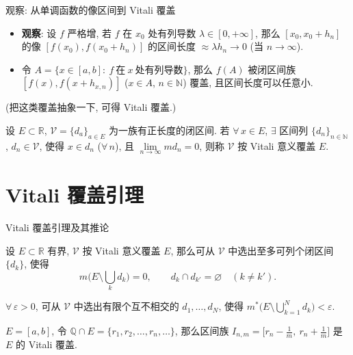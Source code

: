 \begin{frame}{观察: 从单调函数的像区间到 Vitali 覆盖}

\begin{itemize}
\item \textbf{观察}: 设 $f$ 严格增, 若 $f$ 在 $x_0$ 处有列导数 $\lambda \in [0, +\infty]$,
  那么 $[x_0, x_0 + h_n]$ 的像 $[f(x_0), f(x_0 + h_n)]$ 的区间长度
  $\approx \lambda h_n \to 0$ (当 $n \to \infty$).
\item 令 $A = \{ x \in [a, b]:\ f\ \text{在}\ x\ \text{处有列导数} \}$, 那么 $f(A)$
  被闭区间族 $[f(x), f(x + h_{x, n})]$ ($x \in A$, $n \in \mathbb{N}$) 覆盖,
  且区间长度可以任意小.
\end{itemize}

\pause

(把这类覆盖抽象一下, 可得 Vitali 覆盖.)

\begin{Def}[Vitali 覆盖]
设 $E \subset \mathbb{R}$, $\mathscr{V} = \{ d_a \}_{a \in E}$ 为一族有正长度的闭区间.
若 $\forall\, x \in E$, $\exists$ 区间列 $\{ d_n \}_{n \in \mathbb{N}}$, $d_n \in \mathscr{V}$,
使得 $x \in d_n$ ($\forall\, n$), 且 $\lim\limits_{n \to \infty} m d_n = 0$,
则称 $\mathscr{V}$ \alert{按 Vitali 意义覆盖} $E$.
\end{Def}

\end{frame}


\section[Vitali]{Vitali 覆盖引理}


\begin{frame}{Vitali 覆盖引理及其推论}

\begin{thm}
设 $E \subset \mathbb{R}$ 有界, $\mathscr{V}$ 按 Vitali 意义覆盖 $E$,
那么可从 $\mathscr{V}$ 中选出至多可列个闭区间 $\{ d_k \}$, 使得
\[
m \Big( E \setminus \bigcup_k d_k \Big) = 0,
\qquad
d_k \cap d_{k'} = \varnothing \quad (k \neq k') .
\]
\end{thm}

\pause

\begin{cor}[有限不交形式]
$\forall\, \varepsilon > 0$, 可从 $\mathscr{V}$ 中选出\alert{有限}个互不相交的
$d_1, \dots, d_N$, 使得
$m^* \big( E \setminus \bigcup_{k=1}^{N} d_k \big) < \varepsilon$.
\end{cor}

\pause

\begin{eg}
$E = [a, b]$, 令 $\mathbb{Q} \cap E = \{ r_1, r_2, \dots, r_n, \dots \}$,
那么区间族 $I_{n, m} = \big[ r_n - \tfrac1m,\ r_n + \tfrac1m \big]$ 是 $E$ 的 Vitali 覆盖.
\end{eg}

\end{frame}

